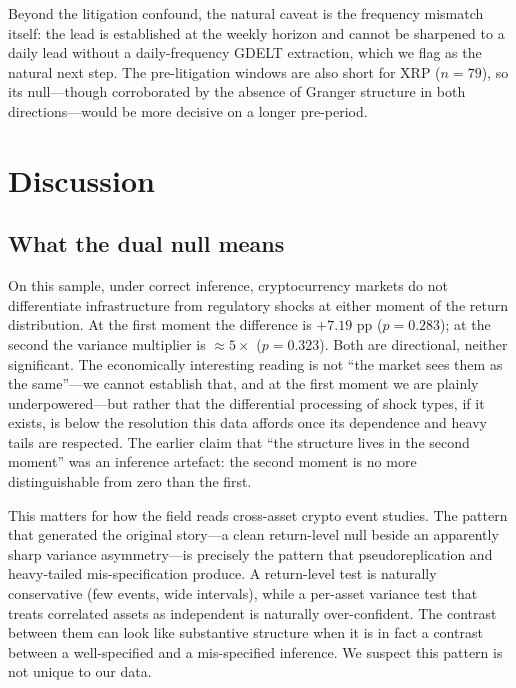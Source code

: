 \documentclass[pdflatex,sn-mathphys-num]{sn-jnl}
\theoremstyle{thmstyleone}
\theoremstyle{thmstyletwo}
\theoremstyle{thmstylethree}
\begin{document}
Beyond the litigation confound, the natural caveat is the frequency mismatch itself: the lead is established at the weekly horizon and cannot be sharpened to a daily lead without a daily-frequency GDELT extraction, which we flag as the natural next step. The pre-litigation windows are also short for XRP ($n=79$), so its null---though corroborated by the absence of Granger structure in both directions---would be more decisive on a longer pre-period.


\section{Discussion}\label{sec:discussion}

\subsection{What the dual null means}

On this sample, under correct inference, cryptocurrency markets do not differentiate infrastructure from regulatory shocks at either moment of the return distribution. At the first moment the difference is $+7.19$ pp ($p=0.283$); at the second the variance multiplier is $\approx 5\times$ ($p=0.323$). Both are directional, neither significant. The economically interesting reading is not ``the market sees them as the same''---we cannot establish that, and at the first moment we are plainly underpowered---but rather that the differential processing of shock types, if it exists, is below the resolution this data affords once its dependence and heavy tails are respected. The earlier claim that ``the structure lives in the second moment'' was an inference artefact: the second moment is no more distinguishable from zero than the first.

This matters for how the field reads cross-asset crypto event studies. The pattern that generated the original story---a clean return-level null beside an apparently sharp variance asymmetry---is precisely the pattern that pseudoreplication and heavy-tailed mis-specification produce. A return-level test is naturally conservative (few events, wide intervals), while a per-asset variance test that treats correlated assets as independent is naturally over-confident. The contrast between them can look like substantive structure when it is in fact a contrast between a well-specified and a mis-specified inference. We suspect this pattern is not unique to our data.
\end{document}
